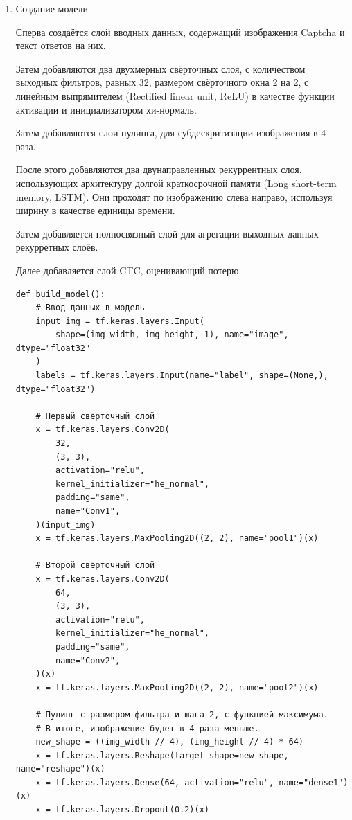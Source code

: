 \documentclass[../document.tex]{subfiles}
\begin{document}
\begin{enumerate}
\begin{verbatim}
validation_dataset = tf.data.Dataset.from_tensor_slices((x_valid, y_valid))
validation_dataset = (
    validation_dataset.map(encode_single_sample, num_parallel_calls=tf.data.AUTOTUNE)
    .batch(batch_size)
    .prefetch(buffer_size=tf.data.AUTOTUNE)
)
\end{verbatim}
\item Создание модели
\par Сперва создаётся слой вводных данных, содержащий изображения Captcha и текст ответов на них.
\par Затем добавляются два двухмерных свёрточных слоя, с количеством выходных фильтров, равных 32, размером свёрточного окна 2 на 2, с линейным выпрямителем (Rectified linear unit, ReLU) в качестве функции активации и инициализатором хи-нормаль.
\par Затем добавляются слои пулинга, для субдескритизации изображения в 4 раза.
\par После этого добавляются два двунаправленных рекуррентных слоя, использующих архитектуру долгой краткосрочной памяти (Long short-term memory, LSTM). Они проходят по изображению слева направо, используя ширину в качестве единицы времени.
\par Затем добавляется полносвязный слой для агрегации выходных данных рекурретных слоёв.
\par Далее добавляется слой CTC, оценивающий потерю.
\begin{verbatim}
def build_model():
    # Ввод данных в модель
    input_img = tf.keras.layers.Input(
        shape=(img_width, img_height, 1), name="image", dtype="float32"
    )
    labels = tf.keras.layers.Input(name="label", shape=(None,), dtype="float32")

    # Первый свёрточный слой
    x = tf.keras.layers.Conv2D(
        32,
        (3, 3),
        activation="relu",
        kernel_initializer="he_normal",
        padding="same",
        name="Conv1",
    )(input_img)
    x = tf.keras.layers.MaxPooling2D((2, 2), name="pool1")(x)

    # Второй свёрточный слой
    x = tf.keras.layers.Conv2D(
        64,
        (3, 3),
        activation="relu",
        kernel_initializer="he_normal",
        padding="same",
        name="Conv2",
    )(x)
    x = tf.keras.layers.MaxPooling2D((2, 2), name="pool2")(x)

    # Пулинг с размером фильтра и шага 2, с функцией максимума.
    # В итоге, изображение будет в 4 раза меньше.
    new_shape = ((img_width // 4), (img_height // 4) * 64)
    x = tf.keras.layers.Reshape(target_shape=new_shape, name="reshape")(x)
    x = tf.keras.layers.Dense(64, activation="relu", name="dense1")(x)
    x = tf.keras.layers.Dropout(0.2)(x)


\end{verbatim}
\end{enumerate}
\end{document}
